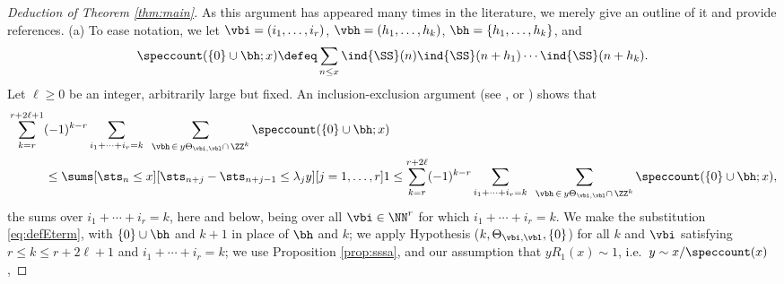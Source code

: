 \documentclass[12pt, reqno, twoside, letterpaper]{amsart}
\begin{document}
\begin{proof}[Deduction of Theorem \ref{thm:main}]
%
As this argument has appeared many times in the literature, we 
merely give an outline of it and provide references.
%
(a) 
% 
To ease notation, we let $\vbi = (i_1,\ldots,i_r)$, 
$\vbh = (h_1,\ldots,h_k)$, $\bh = \{h_1,\ldots,h_k\}$, and 
\[
 \speccount(\{0\} \cup \bh; x)
  \defeq 
   \sum_{n \le x} 
    \ind{\SS}(n)\ind{\SS}(n + h_1)\cdots \ind{\SS}(n + h_k).
\]
%
Let $\ell \ge 0$ be an integer, arbitrarily large but fixed.
%
An inclusion-exclusion argument (see \cite{HOO:65iii}, 
\cite[Appendix A]{KR:99} or \cite[Key Lemma 2.4.12]{KS:99}) shows 
that 
\begin{align}
 \begin{split}
  \label{eq:bded1}
 & 
   \sum_{k = r}^{r + 2\ell + 1}
    (-1)^{k - r}
     \sum_{i_1 + \cdots + i_r = k}
      \hspace{5pt}
       \sum_{\vbh \, \in \, y\Theta_{\vbi,\vbl} \cap \, \ZZ^k}
          \speccount(\{0\} \cup \bh; x)
 \\
 & \hspace{30pt} 
  \le 
     \sums[\sts_n \le x]
          [\sts_{n + j} - \sts_{n + j - 1} \le \lambda_j y] %
          [j = 1,\ldots,r] 1 
   \le 
    \sum_{k = r}^{r + 2\ell}
     (-1)^{k - r}
      \sum_{i_1 + \cdots + i_r = k}
       \hspace{5pt}
        \sum_{\vbh \, \in \, y\Theta_{\vbi,\vbl} \cap \, \ZZ^k}
           \speccount(\{0\} \cup \bh; x),
  \end{split}            
\end{align}
the sums over $i_1 + \cdots + i_r = k$, here and below, being over 
all $\vbi \in \NN^r$ for which $i_1 + \cdots + i_r = k$.
%
We make the substitution \eqref{eq:defEterm}, with 
$\{0\} \cup \bh$ and $k + 1$ in place of $\bh$ and $k$; 
we apply Hypothesis ($k,\Theta_{\vbi,\vbl},\{0\}$) for all 
$k$ and $\vbi$ satisfying $r \le k \le r + 2\ell + 1$ and  
$i_1 + \cdots + i_r = k$;
we use Proposition \ref{prop:sssa}, and our 
assumption that $yR_1(x) \sim 1$, i.e.\ $y \sim x/\speccount(x)$, 

\end{proof}
\end{document}
